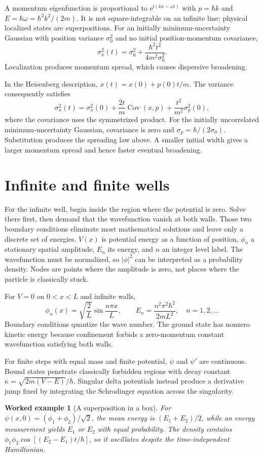 \documentclass[11pt,oneside]{book}
\newcommand{\ii}{\mathrm{i}}
\newcommand{\ee}{\mathrm{e}}
\theoremstyle{reviewstyle}
\newtheorem{example}{Worked example}[chapter]
\begin{document}
A momentum eigenfunction is proportional to $\ee^{\ii(kx-\omega t)}$ with $p=\hbar k$ and $E=\hbar\omega=\hbar^2k^2/(2m)$. It is not square-integrable on an infinite line; physical localized states are superpositions. For an initially minimum-uncertainty Gaussian with position variance $\sigma_0^2$ and no initial position-momentum covariance,
\begin{equation}\sigma_x^2(t)=\sigma_0^2+\frac{\hbar^2t^2}{4m^2\sigma_0^2}.\end{equation}
Localization produces momentum spread, which causes dispersive broadening.

In the Heisenberg description, $x(t)=x(0)+p(0)t/m$. The variance consequently satisfies
\begin{equation}
\sigma_x^2(t)=\sigma_x^2(0)+\frac{2t}{m}\operatorname{Cov}(x,p)
+\frac{t^2}{m^2}\sigma_p^2(0),
\end{equation}
where the covariance uses the symmetrized product. For the initially uncorrelated minimum-uncertainty Gaussian, covariance is zero and $\sigma_p=\hbar/(2\sigma_0)$. Substitution produces the spreading law above. A smaller initial width gives a larger momentum spread and hence faster eventual broadening.

\section{Infinite and finite wells}
For the infinite well, begin inside the region where the potential is zero. Solve there first, then demand that the wavefunction vanish at both walls. Those two boundary conditions eliminate most mathematical solutions and leave only a discrete set of energies. $V(x)$ is potential energy as a function of position, $\phi_n$ a stationary spatial amplitude, $E_n$ its energy, and $n$ an integer level label. The wavefunction must be normalized, so $|\phi|^2$ can be interpreted as a probability density. Nodes are points where the amplitude is zero, not places where the particle is classically stuck.

For $V=0$ on $0<x<L$ and infinite walls,
\begin{equation}\phi_n(x)=\sqrt{\frac2L}\sin\frac{n\pi x}{L},\qquad E_n=\frac{n^2\pi^2\hbar^2}{2mL^2},\quad n=1,2,\ldots\end{equation}
Boundary conditions quantize the wave number. The ground state has nonzero kinetic energy because confinement forbids a zero-momentum constant wavefunction satisfying both walls.

For finite steps with equal mass and finite potential, $\psi$ and $\psi'$ are continuous. Bound states penetrate classically forbidden regions with decay constant $\kappa=\sqrt{2m(V-E)}/\hbar$. Singular delta potentials instead produce a derivative jump fixed by integrating the Schrodinger equation across the singularity.
\begin{example}[A superposition in a box]
For $\psi(x,0)=(\phi_1+\phi_2)/\sqrt2$, the mean energy is $(E_1+E_2)/2$, while an energy measurement yields $E_1$ or $E_2$ with equal probability. The density contains $\phi_1\phi_2\cos[(E_2-E_1)t/\hbar]$, so it oscillates despite the time-independent Hamiltonian.
\end{example}
\end{document}
